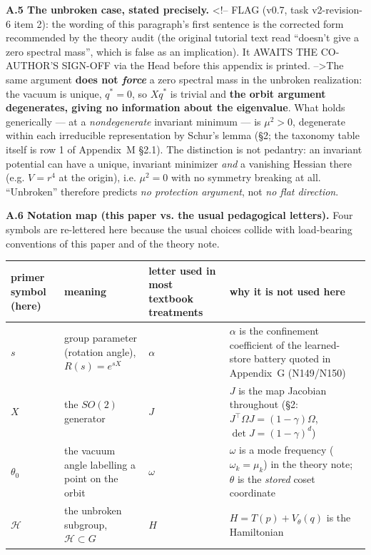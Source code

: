 \documentclass[10pt]{article}
\begin{document}
\textbf{A.5 The unbroken case, stated precisely.} <!-- FLAG (v0.7, task v2-revision-6 item 2): the wording of this paragraph's first sentence is the corrected form recommended by the theory audit (the original tutorial text read ``doesn't give a zero spectral mass'', which is false as an implication). It AWAITS THE CO-AUTHOR'S SIGN-OFF via the Head before this appendix is printed. -->The same argument \textbf{does not \emph{force}} a zero spectral mass in the unbroken realization: the vacuum is unique, $q^*=0$, so $Xq^*$ is trivial and \textbf{the orbit argument degenerates, giving no information about the eigenvalue}. What holds generically --- at a \emph{nondegenerate} invariant minimum --- is $\mu^2>0$, degenerate within each irreducible representation by Schur's lemma (\S2; the taxonomy table itself is row 1 of Appendix~M \S2.1). The distinction is not pedantry: an invariant potential can have a unique, invariant minimizer \emph{and} a vanishing Hessian there (e.g. $V=r^4$ at the origin), i.e. $\mu^2=0$ with no symmetry breaking at all. ``Unbroken'' therefore predicts \emph{no protection argument}, not \emph{no flat direction}.

\textbf{A.6 Notation map (this paper vs. the usual pedagogical letters).} Four symbols are re-lettered here because the usual choices collide with load-bearing conventions of this paper and of the theory note.

\begin{center}\small
\begin{tabular}{@{}l p{1.3in} p{1.0in} p{2.6in}@{}}
\toprule
primer symbol (here) & meaning & letter used in most textbook treatments & why it is not used here \\
\midrule
$s$ & group parameter (rotation angle), $R(s)=e^{sX}$ & $\alpha$ & $\alpha$ is the confinement coefficient of the learned-store battery quoted in Appendix~G (N149/N150) \\
$X$ & the $SO(2)$ generator & $J$ & $J$ is the map Jacobian throughout (\S2: $J^\top\Omega J=(1-\gamma)\Omega$, $\det J=(1-\gamma)^d$) \\
$\theta_0$ & the vacuum angle labelling a point on the orbit & $\omega$ & $\omega$ is a mode frequency ($\omega_k=\mu_k$) in the theory note; $\theta$ is the \emph{stored} coset coordinate \\
$\mathcal H$ & the unbroken subgroup, $\mathcal H\subset G$ & $H$ & $H=T(p)+V_\theta(q)$ is the Hamiltonian \\
\bottomrule
\end{tabular}
\end{center}
\end{document}
